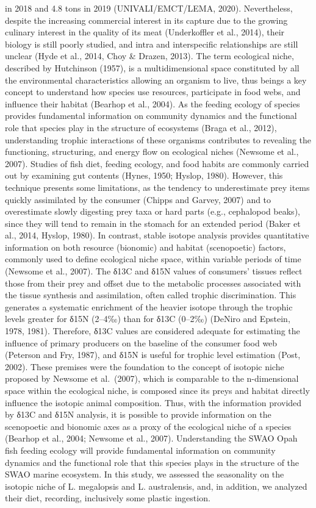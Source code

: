 \documentclass[
]{article}
\begin{document}
in 2018 and 4.8 tons in 2019 (UNIVALI/EMCT/LEMA, 2020). Nevertheless,
despite the increasing commercial interest in its capture due to the
growing culinary interest in the quality of its meat (Underkoffler et
al., 2014), their biology is still poorly studied, and intra and
interspecific relationships are still unclear (Hyde et al., 2014, Choy
\& Drazen, 2013). The term ecological niche, described by Hutchinson
(1957), is a multidimensional space constituted by all the environmental
characteristics allowing an organism to live, thus beings a key concept
to understand how species use resources, participate in food webs, and
influence their habitat (Bearhop et al., 2004). As the feeding ecology
of species provides fundamental information on community dynamics and
the functional role that species play in the structure of ecosystems
(Braga et al., 2012), understanding trophic interactions of these
organisms contributes to revealing the functioning, structuring, and
energy flow on ecological niches (Newsome et al., 2007). Studies of fish
diet, feeding ecology, and food habits are commonly carried out by
examining gut contents (Hynes, 1950; Hyslop, 1980). However, this
technique presents some limitations, as the tendency to underestimate
prey items quickly assimilated by the consumer (Chipps and Garvey, 2007)
and to overestimate slowly digesting prey taxa or hard parts (e.g.,
cephalopod beaks), since they will tend to remain in the stomach for an
extended period (Baker et al., 2014, Hyslop, 1980). In contrast, stable
isotope analysis provides quantitative information on both resource
(bionomic) and habitat (scenopoetic) factors, commonly used to define
ecological niche space, within variable periods of time (Newsome et al.,
2007). The δ13C and δ15N values of consumers' tissues reflect those from
their prey and offset due to the metabolic processes associated with the
tissue synthesis and assimilation, often called trophic discrimination.
This generates a systematic enrichment of the heavier isotope through
the trophic levels greater for δ15N (2--4‰) than for δ13C (0--2‰)
(DeNiro and Epstein, 1978, 1981). Therefore, δ13C values are considered
adequate for estimating the influence of primary producers on the
baseline of the consumer food web (Peterson and Fry, 1987), and δ15N is
useful for trophic level estimation (Post, 2002). These premises were
the foundation to the concept of isotopic niche proposed by Newsome et
al.~(2007), which is comparable to the n-dimensional space within the
ecological niche, is composed since its preys and habitat directly
influence the isotopic animal composition. Thus, with the information
provided by δ13C and δ15N analysis, it is possible to provide
information on the scenopoetic and bionomic axes as a proxy of the
ecological niche of a species (Bearhop et al., 2004; Newsome et al.,
2007). Understanding the SWAO Opah fish feeding ecology will provide
fundamental information on community dynamics and the functional role
that this species plays in the structure of the SWAO marine ecosystem.
In this study, we assessed the seasonality on the isotopic niche of L.
megalopsis and L. australensis, and, in addition, we analyzed their
diet, recording, inclusively some plastic ingestion.
\end{document}
